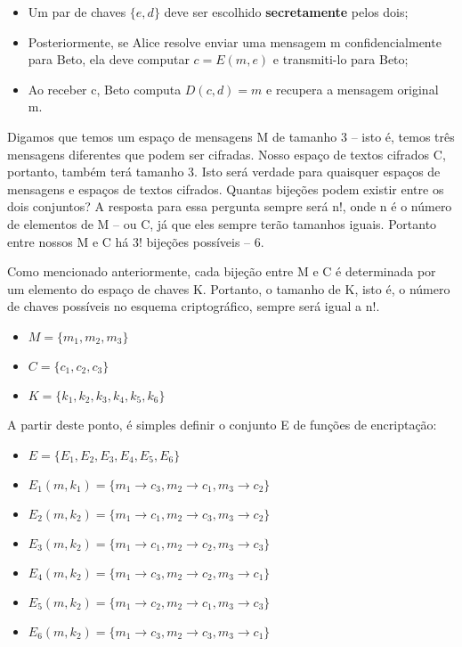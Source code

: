 \documentclass[
	10pt,				%
	openright,			%
	twoside,			%
	a5paper,			%
	english,			%
	french,				%
	spanish,			%
	brazil,				%
	sumario=tradicional
]{abntex2}
\begin{document}
\begin{itemize}[noitemsep]
\item Um par de chaves $\{ e, d \}$ deve ser escolhido \textbf{secretamente} pelos dois;
\item Posteriormente, se Alice resolve enviar uma mensagem m confidencialmente para Beto, ela deve computar $c = E(m, e)$ e transmiti-lo para Beto;
\item Ao receber c, Beto computa $D(c, d) = m$ e recupera a mensagem original m.
\end{itemize}

Digamos que temos um espaço de mensagens M de tamanho 3 – isto é, temos três mensagens diferentes que podem ser cifradas. Nosso espaço de textos cifrados C, portanto, também terá tamanho 3. Isto será verdade para quaisquer espaços de mensagens e espaços de textos cifrados. Quantas bijeções podem existir entre os dois conjuntos? A resposta para essa pergunta sempre será n!, onde n é o número de elementos de M – ou C, já que eles sempre terão tamanhos iguais. Portanto entre nossos M e C há 3! bijeções possíveis – 6.

Como mencionado anteriormente, cada bijeção entre M e C é determinada por um elemento do espaço de chaves K. Portanto, o tamanho de K, isto é, o número de chaves possíveis no esquema criptográfico, sempre será igual a n!.

\begin{itemize}[noitemsep]
\item $M = \{ m_1, m_2, m_3 \}$
\item $C = \{ c_1, c_2, c_3 \}$
\item $K = \{ k_1, k_2, k_3, k_4, k_5, k_6 \}$
\end{itemize}

A partir deste ponto, é simples definir o conjunto E de funções de encriptação:

\begin{itemize}[noitemsep]
\item $E = \{ E_1, E_2, E_3, E_4, E_5, E_6 \}$
\item $E_1 (m, k_1) = \{ m_1 \to c_3, m_2 \to c_1, m_3 \to c_2 \}$
\item $E_2 (m, k_2) = \{ m_1 \to c_1, m_2 \to c_3, m_3 \to c_2 \}$
\item $E_3 (m, k_2) = \{ m_1 \to c_1, m_2 \to c_2, m_3 \to c_3 \}$
\item $E_4 (m, k_2) = \{ m_1 \to c_3, m_2 \to c_2, m_3 \to c_1 \}$
\item $E_5 (m, k_2) = \{ m_1 \to c_2, m_2 \to c_1, m_3 \to c_3 \}$
\item $E_6 (m, k_2) = \{ m_1 \to c_3, m_2 \to c_3, m_3 \to c_1 \}$
\end{itemize}
\end{document}
